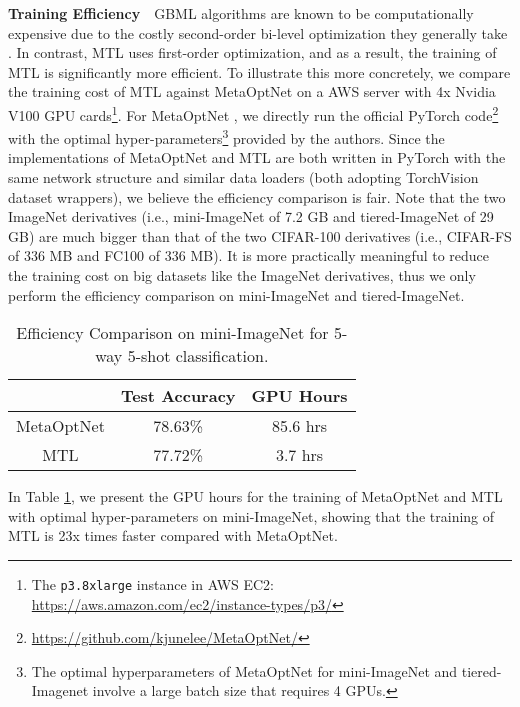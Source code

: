 \documentclass{article}
\begin{document}
\textbf{Training Efficiency}~~GBML algorithms are known to be computationally expensive due to the costly second-order bi-level optimization they generally take \cite{hospedales2020metalearning}. In contrast, MTL uses first-order optimization, and as a result, the training of MTL is significantly more efficient. To illustrate this more concretely, we compare the training cost of MTL against MetaOptNet on a AWS server with 4x Nvidia V100 GPU cards\footnote{The \texttt{p3.8xlarge} instance in AWS EC2: {\url{https://aws.amazon.com/ec2/instance-types/p3/}}}. For MetaOptNet \cite{metaOptNet}, we directly run the official PyTorch code\footnote{{\url{https://github.com/kjunelee/MetaOptNet/}}} with the optimal hyper-parameters\footnote{The optimal hyperparameters of MetaOptNet for mini-ImageNet and tiered-Imagenet involve a large batch size that requires 4 GPUs.} provided by the authors. Since the implementations of MetaOptNet and MTL are both written in PyTorch with the same network structure and similar data loaders (both adopting TorchVision dataset wrappers), we believe the efficiency comparison is fair. Note that the two ImageNet derivatives (i.e., mini-ImageNet of 7.2 GB and tiered-ImageNet of 29 GB) are much bigger than that of the two CIFAR-100 derivatives (i.e., CIFAR-FS of 336 MB and FC100 of 336 MB). It is more practically meaningful to reduce the training cost on big datasets like the ImageNet derivatives, thus we only perform the efficiency comparison on mini-ImageNet and tiered-ImageNet.
 \begin{table}[t!]
     \caption{Efficiency Comparison on mini-ImageNet for 5-way 5-shot classification.}
    \label{tab:gpu-hour:all}
    \vspace{+10pt}
    \centering
    \begin{tabular}{c c c }
        \toprule
         & Test Accuracy & GPU Hours \\
        \midrule
        MetaOptNet & 78.63\%  & 85.6 hrs\\
        \midrule
        MTL & 77.72\% & 3.7 hrs\\
        \bottomrule
    \end{tabular}
\end{table}


In Table \ref{tab:gpu-hour:all}, we present the GPU hours for the training of MetaOptNet and MTL with optimal hyper-parameters on mini-ImageNet, showing that the training of MTL is 23x times faster compared with MetaOptNet. 
\end{document}
